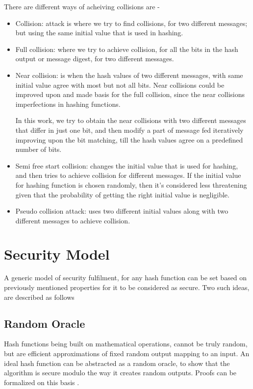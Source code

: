 There are different ways of acheiving collisions are \cite{00045}-
\begin{itemize}
\item Collision: attack is where we try to find collisions, for two different messages; but using the same initial
value that is used in hashing.
\item Full collision: where we try to achieve collision, for all the bits in the hash output or message digest, for
two different messages.
\item Near collision: is when the hash values of two different messages, with same initial value agree with most but
not all bits. Near collisions could be improved upon and made basis for the full collision, since the near collisions
imperfections in hashing functions.

In this work, we try to obtain the near collisions with two different messages that differ in just one bit, and then
modify a part of message fed iteratively improving upon the bit matching, till the hash values agree on a predefined
number of bits.
\item Semi free start collision: changes the initial value that is used for hashing, and then tries to achieve 
collision for different messages. If the initial value for hashing function is chosen randomly, then it's 
considered less threatening given that the probability of getting the right initial value is negligible.
\item Pseudo collision attack: uses two different initial values along with two different messages to achieve 
collision.
\end{itemize}

\section{Security Model}

A generic model of security fulfilment, for any hash function can be set based on previously mentioned
properties for it to be considered as secure. Two such ideas, are described as follows 

  \subsection{ Random Oracle }
  Hash functions being built on mathematical operations, cannot be truly random, but are efficient
  approximations of fixed random output mapping to an input. An ideal hash function can be abstracted 
  as a random oracle, to show that the algorithm is secure modulo the way it creates random outputs. 
  Proofs can be formalized on this basis \cite{00018}.

